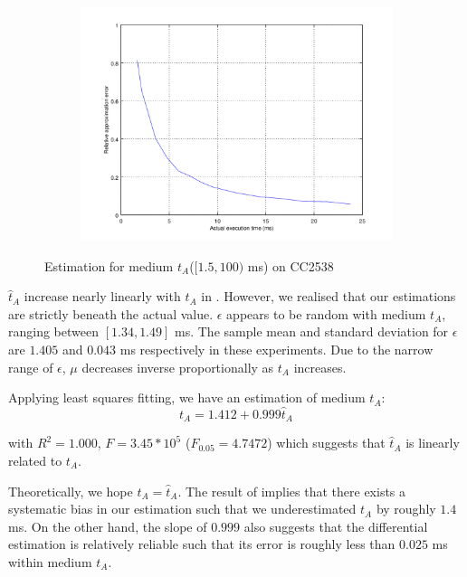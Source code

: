 \begin{figure}[ht!]
\begin{subfigure}{0.45\linewidth}
	\includegraphics[width=\linewidth]{fig/midrtvtaerr.png}
	\end{subfigure}
	\caption{Estimation for medium $t_A$($[1.5,100)$ ms) on CC2538}
	\label{Fig: Estimation for medium tA}
\end{figure}

$\hat{t}_A$ increase nearly linearly with $t_A$ in . However, we realised that our estimations are strictly beneath the actual value. $\epsilon$ appears to be random with medium $t_A$,  ranging between $[1.34, 1.49]$ ms.  The sample mean and standard deviation for $\epsilon$ are $1.405$ and $0.043$ ms respectively in these experiments. Due to the narrow range of $\epsilon$, $\mu$ decreases inverse proportionally as $t_A$ increases.

Applying least squares fitting, we have an estimation of medium $t_A$:
\begin{equation} \label{Eq: midta}
	t_A = 1.412 + 0.999\hat{t}_A 
\end{equation}

with $R^2=1.000$, $F=3.45 * 10^5$ ($F_{0.05} = 4.7472$) which suggests that $\hat{t}_A$ is linearly related to $t_A$. 

Theoretically, we hope $t_A = \hat{t}_A$. The result of  implies that there exists a systematic bias in our estimation such that we underestimated $t_A$ by roughly $1.4$ ms. On the other hand, the slope of $0.999$ also suggests that the differential estimation is relatively reliable such that its error is roughly less than $0.025$ ms within medium $t_A$.

